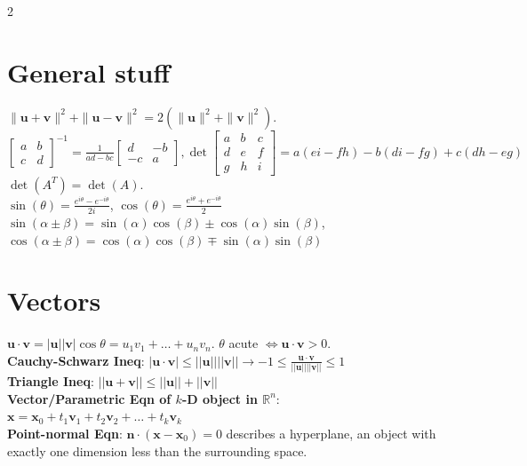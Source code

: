 \documentclass[10pt]{article}
\begin{document}
\small 

\raggedright

\begin{multicols*}{2}

\section*{General stuff}
$\|\mathbf{u} + \mathbf{v}\|^2 + \|\mathbf{u} - \mathbf{v}\|^2 = 2(\|\mathbf{u}\|^2 + \|\mathbf{v}\|^2)$.\\
$\begin{bmatrix}a & b \\ c & d\end{bmatrix}^{-1} = \frac{1}{ad-bc}\begin{bmatrix}d & -b \\ -c & a\end{bmatrix}, \det\begin{bmatrix} 
a & b & c \\ 
d & e & f \\ 
g & h & i 
\end{bmatrix} = a(ei - fh) - b(di - fg) + c(dh - eg)$\\
$\det(A^T) = \det(A)$.\\
$\sin(\theta) = \frac{e^{i\theta} - e^{-i\theta}}{2i}$, $\cos(\theta) = \frac{e^{i\theta} + e^{-i\theta}}{2}$\\
$\sin(\alpha \pm \beta) = \sin(\alpha)\cos(\beta) \pm \cos(\alpha)\sin(\beta)$, $\cos(\alpha \pm \beta) = \cos(\alpha)\cos(\beta) \mp \sin(\alpha)\sin(\beta)$

\section*{Vectors}
$\mathbf{u}\cdot\mathbf{v}=|\mathbf{u}||\mathbf{v}|\cos\theta = u_1v_1 + \ldots + u_nv_n$. $\theta$ acute $\iff \mathbf{u}\cdot \mathbf{v}>0$.\\
\textbf{Cauchy-Schwarz Ineq}: $|\mathbf{u} \cdot \mathbf{v}| \le ||\mathbf{u}|| ||\mathbf{v}||\to -1\leq\frac{\mathbf{u}\cdot\mathbf{v}}{||\mathbf{u}||||\mathbf{v}||}\leq 1$\\
\textbf{Triangle Ineq}: $||\mathbf{u}+\mathbf{v}|| \le ||\mathbf{u}|| + ||\mathbf{v}||$\\
\textbf{Vector/Parametric Eqn of $k$-D object in $\mathbb{R}^n$}: $\mathbf{x} = \mathbf{x}_0 + t_1\mathbf{v}_1 + t_2\mathbf{v}_2 + \dots + t_k\mathbf{v}_k$\\
\textbf{Point-normal Eqn}: $\mathbf{n} \cdot (\mathbf{x} - \mathbf{x}_0) = 0$ describes a hyperplane, an object with exactly one dimension less than the surrounding space.


\end{multicols*}
\end{document}
